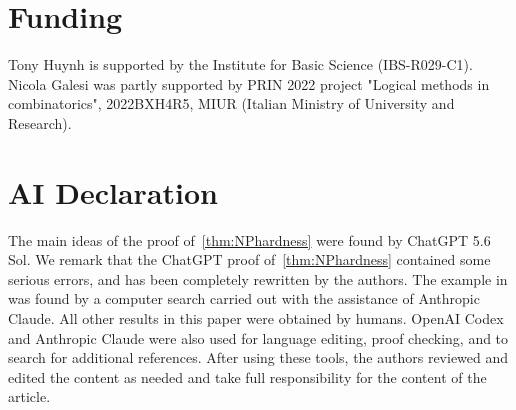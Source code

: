 \documentclass[a4paper,fleqn]{cas-sc}
\theoremstyle{remark}
\theoremstyle{plain}
\begin{document}
\section*{Funding}
Tony Huynh is supported by the Institute for Basic Science (IBS-R029-C1).  Nicola Galesi was partly supported by PRIN 2022 project  "Logical methods in combinatorics", 2022BXH4R5, MIUR
(Italian Ministry of University and Research).



\section*{AI Declaration}
The main ideas of the proof of~\cref{thm:NPhardness} were found by ChatGPT 5.6 Sol. We remark that the ChatGPT proof of~\cref{thm:NPhardness} contained some serious errors, and has been completely rewritten by the authors.  The example in  was found by a computer search carried out with the assistance of Anthropic Claude.  All other results in this paper were obtained by humans.  OpenAI Codex and Anthropic Claude were also used for
language editing, proof checking, and to search for additional references. After using
these tools, the authors reviewed and edited the content as needed and
take full responsibility for the content of the article.



\end{document}
